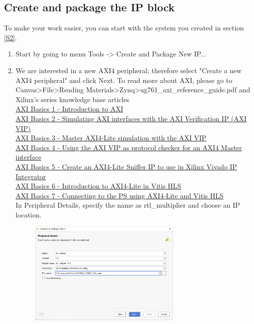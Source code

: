 \documentclass[a4paper,12pt,twoside]{article}
\begin{document}
\subsection{Create and package the IP block}
To make your work easier, you can start with the system you created in section \ref{S2}.
\begin{enumerate}
    \item Start by going to menu Tools -> Create and Package New IP...
    \item We are interested in a new AXI4 peripheral; therefore select "Create a new AXI4 peripheral" and click Next. To read more about AXI, please go to Canvas>File>Reading Materials>Zynq>ug761\_axi\_reference\_guide.pdf and Xilinx's series knowledge base articles\\
    \href{https://support.xilinx.com/s/article/1053914?language=en_US}{AXI Basics 1 - Introduction to AXI}\\
    \href{https://support.xilinx.com/s/article/1053935?language=en_US}{AXI Basics 2 - Simulating AXI interfaces with the AXI Verification IP (AXI VIP)}\\
    \href{https://support.xilinx.com/s/article/1058302?language=en_US}{AXI Basics 3 - Master AXI4-Lite simulation with the AXI VIP}\\
    \href{https://support.xilinx.com/s/article/1062002?language=en_US}{AXI Basics 4 - Using the AXI VIP as protocol checker for an AXI4 Master interface}\\
    \href{https://support.xilinx.com/s/article/1064306?language=en_US}{AXI Basics 5 - Create an AXI4-Lite Sniffer IP to use in Xilinx Vivado IP Integrator}\\
    \href{https://support.xilinx.com/s/article/1137153?language=en_US}{AXI Basics 6 - Introduction to AXI4-Lite in Vitis HLS}\\
    \href{https://support.xilinx.com/s/article/1137753?language=en_US}{AXI Basics 7 - Connecting to the PS using AXI4-Lite and Vitis HLS}\\
    In Peripheral Details, specify the name as rtl\_multiplier and choose an IP location.
    \begin{figure}[H]
        \centering
        \includegraphics[width=0.7\textwidth]{images/23.png}

\end{figure}
\end{enumerate}
\end{document}
